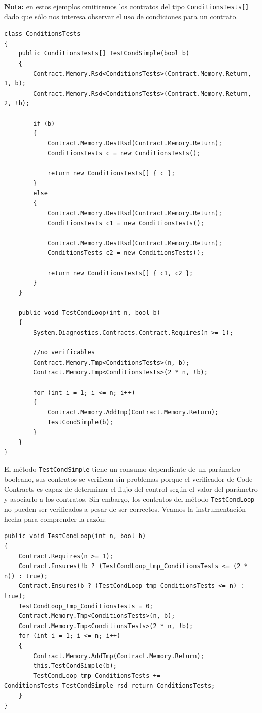 \documentclass[12pt,a4paper]{article}
\newcommand\mono[1]{\texttt{#1}}
\begin{document}
			\textbf{Nota:} en estos ejemplos omitiremos los contratos del tipo \mono{ConditionsTests[]} dado que sólo nos interesa observar el uso de condiciones para un contrato.

			\vspace{15pt}
			\begin{footnotesize}
			\begin{lstlisting}[caption=Ejemplo con condiciones en los contratos]
class ConditionsTests
{
	public ConditionsTests[] TestCondSimple(bool b)
	{
		Contract.Memory.Rsd<ConditionsTests>(Contract.Memory.Return, 1, b);
		Contract.Memory.Rsd<ConditionsTests>(Contract.Memory.Return, 2, !b);

		if (b)
		{
			Contract.Memory.DestRsd(Contract.Memory.Return);
			ConditionsTests c = new ConditionsTests();

			return new ConditionsTests[] { c };
		}
		else
		{
			Contract.Memory.DestRsd(Contract.Memory.Return);
			ConditionsTests c1 = new ConditionsTests();

			Contract.Memory.DestRsd(Contract.Memory.Return);
			ConditionsTests c2 = new ConditionsTests();

			return new ConditionsTests[] { c1, c2 };
		}
	}

	public void TestCondLoop(int n, bool b)
	{
		System.Diagnostics.Contracts.Contract.Requires(n >= 1);

		//no verificables
		Contract.Memory.Tmp<ConditionsTests>(n, b);
		Contract.Memory.Tmp<ConditionsTests>(2 * n, !b);

		for (int i = 1; i <= n; i++)
		{
			Contract.Memory.AddTmp(Contract.Memory.Return);
			TestCondSimple(b);
		}
	}
}
			\end{lstlisting}
			\end{footnotesize}
			El método \mono{TestCondSimple} tiene un consumo dependiente de un parámetro booleano, sus contratos se verifican sin problemas porque el verificador de Code Contracts es capaz de determinar el flujo del control según el valor del parámetro y asociarlo a los contratos. Sin embargo, los contratos del método \mono{TestCondLoop} no pueden ser verificados a pesar de ser correctos. Veamos la instrumentación hecha para comprender la razón:
			\vspace{15pt}
			\begin{footnotesize}
			\begin{lstlisting}[caption=Instrumentación del método \mono{TestCondSimple}]
public void TestCondLoop(int n, bool b)
{
	Contract.Requires(n >= 1);
	Contract.Ensures(!b ? (TestCondLoop_tmp_ConditionsTests <= (2 * n)) : true);
	Contract.Ensures(b ? (TestCondLoop_tmp_ConditionsTests <= n) : true);
	TestCondLoop_tmp_ConditionsTests = 0;
	Contract.Memory.Tmp<ConditionsTests>(n, b);
	Contract.Memory.Tmp<ConditionsTests>(2 * n, !b);
	for (int i = 1; i <= n; i++)
	{
		Contract.Memory.AddTmp(Contract.Memory.Return);
		this.TestCondSimple(b);
		TestCondLoop_tmp_ConditionsTests += ConditionsTests_TestCondSimple_rsd_return_ConditionsTests;
	}
}
			\end{lstlisting}
			\end{footnotesize}
\end{document}
